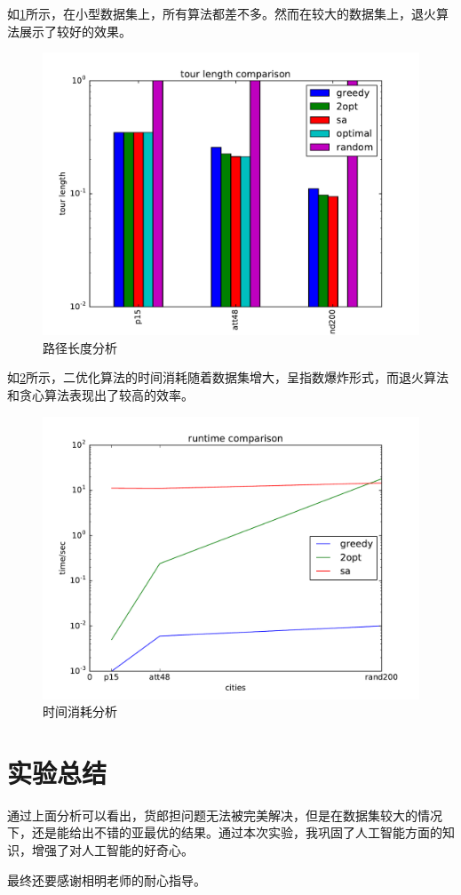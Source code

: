 \documentclass{article}
\newcommand{\huo}{货郎担问题}
\begin{document}
\begin{CJK}{UTF8}{gkai}
如\ref{fig:path}所示，在小型数据集上，所有算法都差不多。然而在较大的数据集上，退火算法展示了较好的效果。

\begin{figure}[!h]
	\centering
	\includegraphics[width=.7\linewidth]{length}
	\caption{路径长度分析}
	\label{fig:path}
\end{figure}
如\ref{fig:time}所示，二优化算法的时间消耗随着数据集增大，呈指数爆炸形式，而退火算法和贪心算法表现出了较高的效率。
\begin{figure}[!h]
	\centering
	\includegraphics[width=.7\linewidth]{time}
	\caption{时间消耗分析}
	\label{fig:time}
\end{figure}



\section{实验总结}
通过上面分析可以看出，\huo 无法被完美解决，但是在数据集较大的情况下，还是能给出不错的亚最优的结果。通过本次实验，我巩固了人工智能方面的知识，增强了对人工智能的好奇心。

最终还要感谢相明老师的耐心指导。

{\small
	
	
}
\end{CJK}
\end{document}
